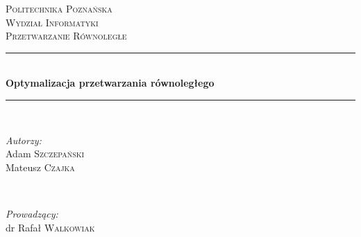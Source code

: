 \begin{titlepage}

\newcommand{\HRule}{\rule{\linewidth}{0.5mm}} %

\center %
 

\textsc{\LARGE Politechnika Poznańska}\\[1.5cm] %
\textsc{\Large Wydział Informatyki}\\[0.5cm] %
\textsc{\large Przetwarzanie Równoległe}\\[0.5cm] %


\HRule \\[0.4cm]
{ \huge \bfseries Optymalizacja przetwarzania równoległego}\\[0.4cm] %
\HRule \\[1.5cm]
 

\begin{minipage}[t]{0.4\textwidth}
\begin{flushleft} \large
\emph{Autorzy:}\\
Adam \textsc{Szczepański} \\
Mateusz \textsc{Czajka} %
\end{flushleft}
\end{minipage}
~
\begin{minipage}[t]{0.4\textwidth}
\begin{flushright} \large
\emph{Prowadzący:} \\
dr Rafał \textsc{Walkowiak} %
\end{flushright}
\end{minipage}\\[2cm]


\end{titlepage}

